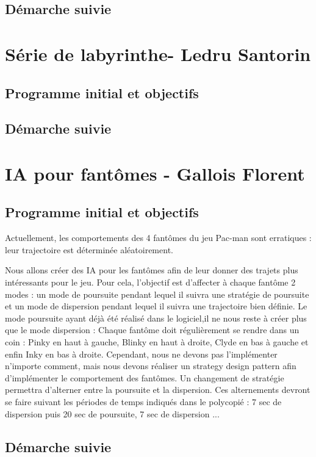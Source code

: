 \documentclass[a4paper,12pt]{report} %
\begin{document}
\subsection{Démarche suivie}

\section{Série de labyrinthe- Ledru Santorin}
\subsection{Programme initial et objectifs}
\subsection{Démarche suivie}


\section{IA pour fantômes - Gallois Florent}
\subsection{Programme initial et objectifs}
Actuellement, les comportements des 4 fantômes du jeu Pac-man sont erratiques : 
leur trajectoire est déterminée aléatoirement.

Nous allons créer des IA pour les fantômes afin de leur donner des trajets plus intéressants pour le jeu.
Pour cela, l'objectif est d'affecter à chaque fantôme 2 modes : un mode de poursuite pendant lequel il suivra une stratégie de poursuite et un mode de dispersion pendant lequel il suivra une trajectoire bien définie.
Le mode poursuite ayant déjà été réalisé dans le logiciel,il ne nous reste à créer plus que le mode dispersion : 
Chaque fantôme doit régulièrement se rendre dans un coin : Pinky en haut à gauche, Blinky en haut à droite, Clyde en bas à gauche et enfin Inky en bas à droite.
Cependant, nous ne devons pas l'implémenter n'importe comment, mais nous devons réaliser un strategy design pattern afin d'implémenter le comportement des fantômes.
Un changement de stratégie permettra d'alterner entre la poursuite et la dispersion.
Ces alternements devront se faire suivant les périodes de temps indiqués dans le polycopié : 7 sec de dispersion puis 20 sec de poursuite, 7 sec de dispersion ... 

\subsection{Démarche suivie}
\end{document}

